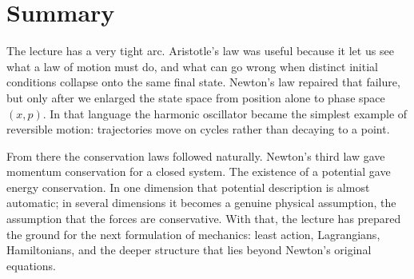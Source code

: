 \section{Summary}

The lecture has a very tight arc. Aristotle's law was useful because it let us see what a law of motion must do, and what can go wrong when distinct initial conditions collapse onto the same final state. Newton's law repaired that failure, but only after we enlarged the state space from position alone to phase space \((x,p)\). In that language the harmonic oscillator became the simplest example of reversible motion: trajectories move on cycles rather than decaying to a point.

From there the conservation laws followed naturally. Newton's third law gave momentum conservation for a closed system. The existence of a potential gave energy conservation. In one dimension that potential description is almost automatic; in several dimensions it becomes a genuine physical assumption, the assumption that the forces are conservative. With that, the lecture has prepared the ground for the next formulation of mechanics: least action, Lagrangians, Hamiltonians, and the deeper structure that lies beyond Newton's original equations.